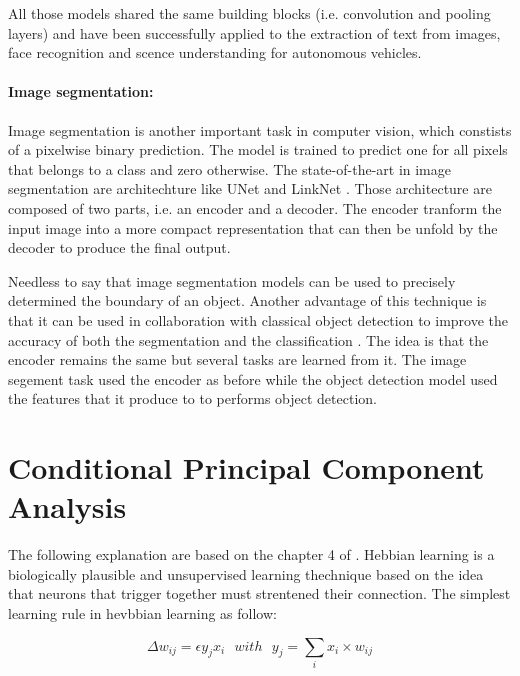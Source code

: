 \documentclass[11pt]{report}
\begin{document}
\noindent All those models shared the same building blocks (i.e. convolution and pooling layers) and have been successfully applied to the extraction of text from images, face recognition and scence understanding for autonomous vehicles.

\paragraph{Image segmentation:} Image segmentation is another important task in computer vision, which constists of a pixelwise binary prediction. The model is trained to predict one for all pixels that belongs to a class and zero otherwise. The state-of-the-art in image segmentation are architechture like UNet \cite{DBLP:conf/miccai/RonnebergerFB15} and LinkNet \cite{DBLP:conf/vcip/ChaurasiaC17}. Those architecture are composed of two parts, i.e. an encoder and a decoder. The encoder tranform the input image into a more compact representation that can then be unfold by the decoder to produce the final output.\newline

\noindent Needless to say that image segmentation models can be used to precisely determined the boundary of an object. Another advantage of this technique is that it can be used in collaboration with classical object detection to improve the accuracy of both the segmentation and the classification \cite{DBLP:conf/cvpr/KendallGC18}. The idea is that the encoder remains the same but several tasks are learned from it. The image segement task used the encoder as before while the object detection model used the features that it produce to to performs object detection.

\section{Conditional Principal Component Analysis}

The following explanation are based on the chapter 4 of \textcite{OReilly:2000:CEC:557205:chap4}. Hebbian learning is a biologically plausible and unsupervised learning thechnique based on the idea that neurons that trigger together must strentened their connection. The simplest learning rule in hevbbian learning as follow:

\begin{equation}
\Delta w_{ij} = \epsilon y_jx_i\ \ \ with\ \ \ y_j = \sum_{i}{x_i \times w_{ij}}
\end{equation}
\end{document}
